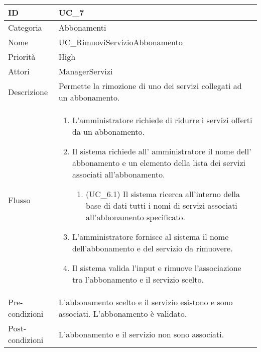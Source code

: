 \begin{center}
\begin{tabular}{ |p{2cm}|p{13cm}|  }
\hline
ID & UC\_7 \\\hline
Categoria & Abbonamenti\\\hline
Nome & UC\_RimuoviServizioAbbonamento\\\hline
Priorità & High \\\hline
Attori &  ManagerServizi \\\hline
Descrizione & Permette la rimozione di uno dei servizi collegati ad un abbonamento.\\\hline
Flusso &  	\begin{enumerate}
			\item L'amministratore richiede di ridurre i servizi offerti da  un abbonamento.
			\item Il sistema richiede all' amministratore il nome dell' abbonamento e un elemento della lista dei servizi associati all'abbonamento.
			\begin{enumerate}
				\item (UC\_6.1) Il sistema ricerca all'interno della base di dati tutti i nomi di servizi associati all'abbonamento specificato.
			\end{enumerate}
			\item L'amministratore fornisce al sistema il nome dell'abbonamento e del servizio da rimuovere.
			\item Il sistema valida l'input e rimuove l'associazione tra l'abbonamento e il servizio scelto.
		\end{enumerate}\\\hline
Pre-condizioni &  L'abbonamento scelto e il servizio esistono e sono associati.\newline 
			L'abbonamento è validato.\\\hline
Post-condizioni &  L'abbonamento e il servizio non sono associati.\\\hline
\end{tabular}
\label{table_use_case:7}\newline


\end{center}
